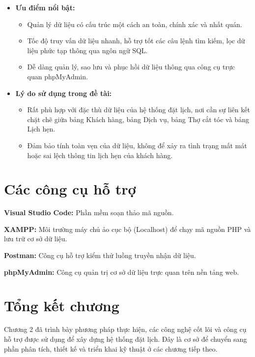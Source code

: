 \begin{itemize}
\item
	\textbf{Ưu điểm nổi bật:}

	\begin{itemize}
	\item
		Quản lý dữ liệu có cấu trúc một cách an toàn, chính xác và nhất
		quán.
	\item
		Tốc độ truy vấn dữ liệu nhanh, hỗ trợ tốt các câu lệnh tìm kiếm, lọc
		dữ liệu phức tạp thông qua ngôn ngữ SQL.
	\item
		Dễ dàng quản lý, sao lưu và phục hồi dữ liệu thông qua công cụ trực
		quan phpMyAdmin.
	\end{itemize}
\item
	\textbf{Lý do sử dụng trong đề tài:}

	\begin{itemize}
	\item
		Rất phù hợp với đặc thù dữ liệu của hệ thống đặt lịch, nơi cần sự
		liên kết chặt chẽ giữa bảng Khách hàng, bảng Dịch vụ, bảng Thợ cắt
		tóc và bảng Lịch hẹn.
	\item
		Đảm bảo tính toàn vẹn của dữ liệu, không để xảy ra tình trạng mất
		mát hoặc sai lệch thông tin lịch hẹn của khách hàng.
	\end{itemize}
\end{itemize}

\section{Các công cụ hỗ trợ}
\textbf{Visual Studio Code:} Phần mềm soạn thảo mã nguồn.

\textbf{XAMPP:} Môi trường máy chủ ảo cục bộ (Localhost) để chạy mã
nguồn PHP và lưu trữ cơ sở dữ liệu.

\textbf{Postman:} Công cụ hỗ trợ kiểm thử luồng truyền nhận dữ liệu.

\textbf{phpMyAdmin:} Công cụ quản trị cơ sở dữ liệu trực quan trên nền
tảng web.

\section{Tổng kết chương}
Chương 2 đã trình bày phương pháp thực hiện, các công nghệ cốt lõi và
công cụ hỗ trợ được sử dụng để xây dựng hệ thống đặt lịch. Đây là cơ sở
để chuyển sang phần phân tích, thiết kế và triển khai kỹ thuật ở các
chương tiếp theo.
